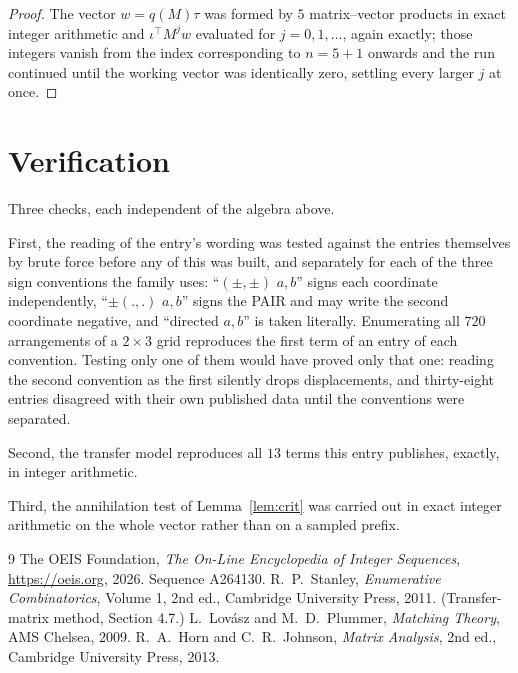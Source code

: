 \documentclass[11pt,a4paper]{article}
\theoremstyle{plain}
\theoremstyle{definition}
\begin{document}
\begin{proof}
The vector $w=q(M)\tau$ was formed by $5$ matrix--vector products in exact integer
arithmetic and $\iota^{\!\top}M^{j}w$ evaluated for $j=0,1,\dots$, again exactly; those
integers vanish from the index corresponding to $n=5+1$ onwards and the run continued
until the working vector was identically zero, settling every larger $j$ at once.
\end{proof}

\section{Verification}

Three checks, each independent of the algebra above.

First, the reading of the entry's wording was tested against the entries themselves by brute
force before any of this was built, and separately for each of the three sign conventions the
family uses: ``$(\pm,\pm)$ $a,b$'' signs each coordinate independently, ``$\pm(.,.)$ $a,b$''
signs the PAIR and may write the second coordinate negative, and ``directed $a,b$'' is taken
literally. Enumerating all $720$ arrangements of a $2\times3$ grid reproduces the first term
of an entry of each convention. Testing only one of them would have proved only that one:
reading the second convention as the first silently drops displacements, and thirty-eight
entries disagreed with their own published data until the conventions were separated.

Second, the transfer model reproduces all $13$ terms this entry publishes, exactly, in
integer arithmetic.

Third, the annihilation test of Lemma~\ref{lem:crit} was carried out in exact integer
arithmetic on the whole vector rather than on a sampled prefix.

\begin{thebibliography}{9}
 The OEIS Foundation, \emph{The On-Line Encyclopedia of Integer
Sequences}, \url{https://oeis.org}, 2026. Sequence A264130.
 R.~P.~Stanley, \emph{Enumerative Combinatorics}, Volume 1, 2nd ed.,
Cambridge University Press, 2011. (Transfer-matrix method, Section 4.7.)
 L.~Lov\'asz and M.~D.~Plummer, \emph{Matching Theory}, AMS Chelsea, 2009.
 R.~A.~Horn and C.~R.~Johnson, \emph{Matrix Analysis}, 2nd ed., Cambridge
University Press, 2013.
\end{thebibliography}
\end{document}
